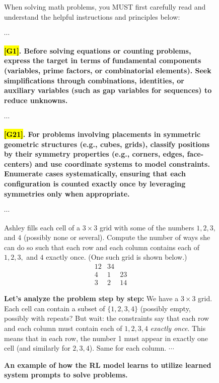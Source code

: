 \documentclass{article}
\theoremstyle{plain}
\theoremstyle{definition}
\theoremstyle{remark}
\begin{document}
\begin{figure}[!tb]
\centering
\caption{\textbf{An example of how the RL model learns to utilize learned system prompts to solve problems.}}

\begin{runcard}[title={Example of How E-SPL Shapes Model Behavior}]

\medskip

\begin{runbox}[title={\textbf{Learned System Prompt}}]
When solving math problems, you MUST first carefully read and understand the helpful instructions and principles below:

$\cdots$

\textbf{\color{Brown}\hl{{[G1]}}. Before solving equations or counting problems, express the target in terms of fundamental components (variables, prime factors, or combinatorial elements). Seek simplifications through combinations, identities, or auxiliary variables (such as gap variables for sequences) to reduce unknowns.}

$\cdots$

\textbf{\color{Brown}\hl{{[G21]}}. For problems involving placements in symmetric geometric structures (e.g., cubes, grids), classify positions by their symmetry properties (e.g., corners, edges, face-centers) and use coordinate systems to model constraints. Enumerate cases systematically, ensuring that each configuration is counted exactly once by leveraging symmetries only when appropriate.}

$\cdots$

\end{runbox}

\begin{runbox}[title={Problem}]
Ashley fills each cell of a $3 \times 3$ grid with some of the numbers $1,2,3,$ and $4$ (possibly none or several).
Compute the number of ways she can do so such that each row and each column contains each of $1,2,3,$ and $4$ exactly once. (One such grid is shown below.)
\[
\begin{array}{cccc}
1 2 & 3 4 & \\
4 & 1 & 2 3 \\
3 & 2 & 1 4
\end{array}
\]

\end{runbox}

\begin{runbox}[title={Model Output}]

\textbf{Let's analyze the problem step by step:} We have a \(3 \times 3\) grid. Each cell can contain a subset of \(\{1,2,3,4\}\) (possibly empty, possibly with repeats? But wait: the constraints say that each row and each column must contain each of \(1,2,3,4\) \emph{exactly once}. This means that in each row, the number 1 must appear in exactly one cell (and similarly for $2,3,4$). Same for each column. \quad $\cdots$


\end{runbox}
\end{runcard}
\end{figure}
\end{document}
